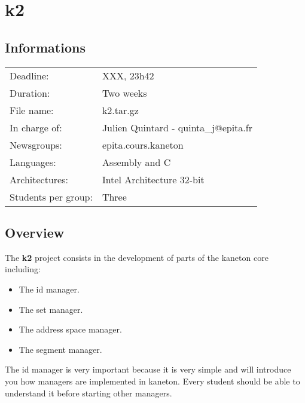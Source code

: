 
%
%

\section{k2}

%
%

\subsection{Informations}

\begin{tabular}{p{7cm}l}
Deadline: & XXX, 23h42 \\
Duration: & Two weeks \\
File name: & k2.tar.gz \\
In charge of: & Julien Quintard - \small{quinta\_j@epita.fr} \\
Newsgroups: & epita.cours.kaneton \\
Languages: & Assembly and C \\
Architectures: & Intel Architecture 32-bit \\
Students per group: & Three \\
\end{tabular}

%
%

\subsection{Overview}

The \textbf{k2} project consists in the development of parts of
the kaneton core including:

\begin{itemize}
  \item
    The id manager.
  \item
    The set manager.
  \item
    The address space manager.
  \item
    The segment manager.
\end{itemize}

The id manager is very important because it is very simple and will
introduce you how managers are implemented in kaneton. Every student
should be able to understand it before starting other managers.

